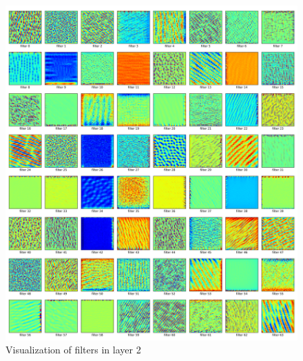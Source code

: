 \documentclass[fleqn,a4paper,12pt]{article}
\begin{document}
\begin{figure}[h]
  \centering
  \includegraphics[width=\linewidth]{report-imgs/filter-visualize.png}
  \caption{Visualization of filters in layer 2}
  \label{fig:Visualization of filters in layer 2}
\end{figure}
\end{document}
